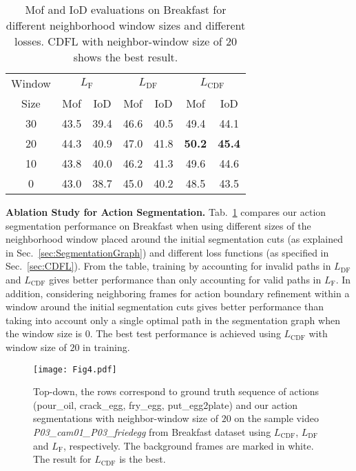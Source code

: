 \documentclass[10pt,twocolumn,letterpaper]{article}
\begin{document}
\begin{table}
\begin{center}
\begin{tabular}{|c|c|c|c|c|c|c|}
\cline{1-7}
Window & \multicolumn{2}{c|}{$L_\text{F}$}&\multicolumn{2}{c|}{$L_\text{DF}$}&\multicolumn{2}{c|}{$L_\text{CDF}$}\\
\cline{2-7}
Size & Mof & IoD & Mof & IoD & Mof & IoD \\
\hline 
30 & 43.5 & 39.4 & 46.6 & 40.5 & 49.4 & 44.1 \\
\hline 
20 & 44.3 & 40.9 & 47.0 & 41.8 & {\bf 50.2} & {\bf 45.4} \\
\hline 
10 & 43.8 & 40.0 & 46.2 & 41.3 & 49.6 & 44.6\\
\hline 
0 & 43.0 & 38.7 & 45.0 & 40.2 & 48.5 & 43.5\\
\hline
\end{tabular}
\end{center}
\caption{Mof and IoD evaluations on Breakfast for different neighborhood window sizes and different losses. CDFL with neighbor-window size of 20 shows the best result.}
\label{table:Different Training Strategies}
\end{table}


{\bf  Ablation Study for Action Segmentation.} Tab.~\ref{table:Different Training Strategies} compares our action segmentation performance on Breakfast when using different sizes of the neighborhood window placed around the initial segmentation cuts (as explained in Sec.~\ref{sec:SegmentationGraph}) and different loss functions (as specified in Sec.~\ref{sec:CDFL}). From the table, training by accounting for invalid paths in $L_{\text{DF}}$ and $L_{\text{CDF}}$ gives better performance than only accounting for valid paths in $L_{\text{F}}$. In addition, considering neighboring frames for action boundary refinement within a window around the initial segmentation cuts gives better performance than taking into account only a single optimal path in the segmentation graph when the window size is $0$. The best test performance is achieved using $L_{\text{CDF}}$ with window size of $20$ in training.

\begin{figure}
\centering
\texttt{[image: Fig4.pdf]}
\caption{Top-down, the rows
correspond to ground truth sequence of actions (\textcolor{mygold}{pour\_oil}, \textcolor{mymaroon}{crack\_egg}, \textcolor{mygreen}{fry\_egg}, \textcolor{myaquamarine}{put\_egg2plate}) and our action segmentations with neighbor-window size of $20$ on the sample video \textit{P03\_cam01\_P03\_friedegg} from Breakfast dataset using $L_{\text{CDF}}$, $L_{\text{DF}}$ and $L_{\text{F}}$, respectively. The background frames are marked in white. The result for $L_{\text{CDF}}$ is the best.}
\label{fig:diff_strategies}
\end{figure}
\end{document}
